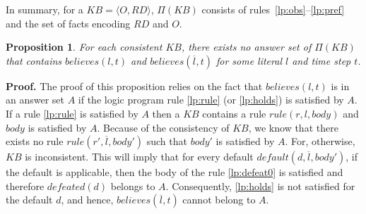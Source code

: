 \documentclass{article}
\newtheorem{proposition}[theorem]{Proposition}
\def\naf{\: {not} \:}
\begin{document}
%
% 
% 
%
%
%
%
%
%
%
%
%

In summary, for a $KB = \langle O, RD \rangle$, $\Pi(KB)$ consists of rules~\eqref{lp:obs}--\eqref{lp:pref} and the set of facts encoding $RD$ and $O$.

%
\begin{proposition}
For each consistent $KB$,  there exists no answer set of $\Pi(KB)$ that contains $believes(l, t)$ and $believes(\overline{l},t)$ for some 
literal $l$ and time step $t$. 
\end{proposition} 
%
\noindent
{\bf Proof.}
The proof of this proposition relies on the fact that $believes(l, t)$ is in an answer set $A$ if the logic program  rule \eqref{lp:rule} (or \eqref{lp:holds}) is satisfied by $A$. If a rule \eqref{lp:rule} is satisfied by $A$ then a $KB$ contains a rule $rule(r,l,body)$ and $body$ is satisfied by $A$. Because of the consistency of $KB$, we know that there exists no rule $rule(r', \overline{l}, body')$ such that $body'$ is satisfied by $A$. For, otherwise, $KB$ is inconsistent. This will imply that for every default $default(d, \overline{l}, body')$, if the default is applicable, then the body of the rule \eqref{lp:defeat0} is satisfied and therefore $defeated(d)$ belongs to $A$. Consequently, \eqref{lp:holds} is not satisfied for the default $d$, and hence, $believes(\overline{l}, t)$ cannot belong to $A$.
\end{document}
